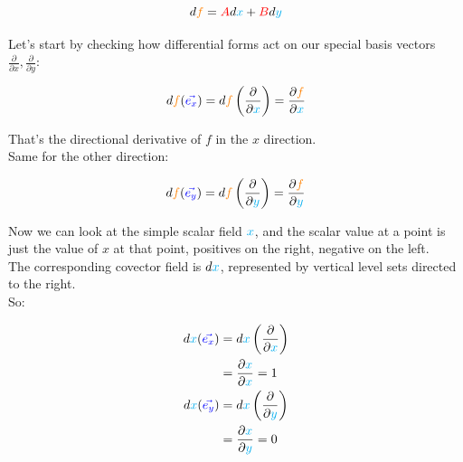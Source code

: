\begin{equation}
    d\begingroup\color{orange}f\endgroup = \begingroup\color{red} A \endgroup d\begingroup\color{cyan}x\endgroup + \begingroup\color{red} B \endgroup d\begingroup\color{cyan}y\endgroup
\end{equation}

Let's start by checking how differential forms act on our special basis vectors $\frac{\partial}{\partial x}, \frac{\partial}{\partial y}$:

\begin{equation}
    d\begingroup\color{orange}f\endgroup (\begingroup\color{blue}\vec{e_x}\endgroup) = 
    d\begingroup\color{orange}f\endgroup \left(\frac{\partial}{\partial \begingroup\color{cyan}x\endgroup}\right) = \frac{\partial \begingroup\color{orange}f\endgroup}{\partial \begingroup\color{cyan}x\endgroup}
\end{equation}

That's the directional derivative of $f$ in the $x$ direction.\\ 
Same for the other direction:

\begin{equation}
    d\begingroup\color{orange}f\endgroup (\begingroup\color{blue}\vec{e_y}\endgroup) = 
    d\begingroup\color{orange}f\endgroup \left(\frac{\partial}{\partial \begingroup\color{cyan}y\endgroup}\right) = \frac{\partial \begingroup\color{orange}f\endgroup}{\partial \begingroup\color{cyan}y\endgroup}
\end{equation}

Now we can look at the simple scalar field $\color{cyan}x$, and the scalar value at a point is just the value of $x$ at that point, positives on the right, negative on the left.\\
The corresponding covector field is $d\color{cyan}x$, represented by vertical level sets directed to the right.\\
So:

\begin{align*}
    d\begingroup\color{cyan}x\endgroup (\begingroup\color{blue}\vec{e_x}\endgroup) &= d\begingroup\color{cyan}x\endgroup \left(\frac{\partial}{\partial \begingroup\color{cyan}x\endgroup}\right)\\
    &= \frac{\partial \begingroup\color{cyan}x\endgroup}{\partial \begingroup\color{cyan}x\endgroup} = 1\\
    d\begingroup\color{cyan}x\endgroup (\begingroup\color{blue}\vec{e_y}\endgroup) &= d\begingroup\color{cyan}x\endgroup \left(\frac{\partial}{\partial \begingroup\color{cyan}y\endgroup}\right)\\
    &= \frac{\partial \begingroup\color{cyan}x\endgroup}{\partial \begingroup\color{cyan}y\endgroup} = 0
\end{align*}

